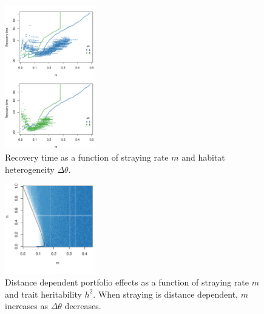 \documentclass[twocolumn,preprintnumbers,amsmath,amssymb,superscriptaddress]{revtex4}
\begin{document}
\begin{figure}
  \captionsetup{justification=raggedright,
singlelinecheck=false
}
\centering
\includegraphics[width=0.35\textwidth]{figs2/fig_relaxtheta.pdf}
\caption{
Recovery time as a function of straying rate $m$ and habitat heterogeneity $\Delta\theta$.
} \label{fig:relaxtheta}
\end{figure}


\begin{figure}
  \captionsetup{justification=raggedright,
singlelinecheck=false
}
  \centering
  \includegraphics[width=0.35\textwidth]{figs2/fig_MDPE_hm_mtheta_rt.pdf}
  \caption{
  Distance dependent portfolio effects as a function of straying rate $m$ and trait heritability $h^2$. When straying is distance dependent, $m$ increases as $\Delta\theta$ decreases.
  } \label{fig:mthetaPE}
\end{figure}
\end{document}
